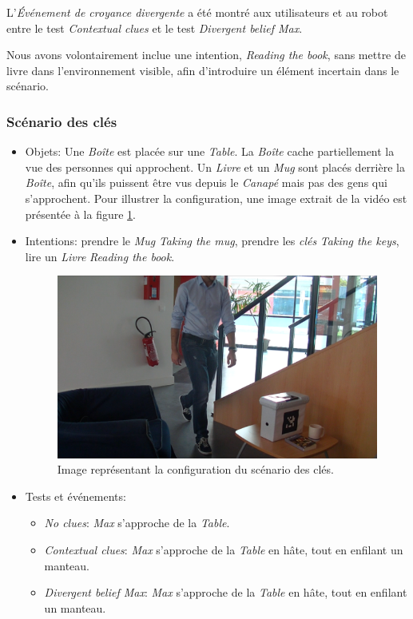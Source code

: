 \documentclass[a4paper,11pt,twoside]{StyleThese}
\begin{document}
L'\textit{Événement de croyance divergente} a été montré aux utilisateurs et au robot entre le test \textit{Contextual clues} et le test \textit{Divergent belief Max}. 

Nous avons volontairement inclue une intention, \textit{Reading the book}, sans mettre de livre dans l'environnement visible, afin d'introduire un élément incertain dans le scénario.

\subsubsection{Scénario des clés}
\begin{itemize}

\item Objets: Une \textit{Boîte} est placée sur une \textit{Table}. La \textit{Boîte} cache partiellement la vue des personnes qui approchent. Un \textit{Livre} et un \textit{Mug} sont placés derrière la \textit{Boîte}, afin qu'ils puissent être vus depuis le \textit{Canapé} mais pas des gens qui s'approchent. Pour illustrer la configuration, une image extrait de la vidéo est présentée à la figure \ref{fig:keyScen}.

\item Intentions: prendre le \textit{Mug} \textit{Taking the mug}, prendre les \textit{clés} \textit{Taking the keys}, lire un \textit{Livre} \textit{Reading the book}.



\begin{figure}[ht!]
  \centering
 \includegraphics[width=0.8\linewidth]{./intention/keys1.png} 
  \caption {Image représentant la configuration du scénario des clés.}
  \label{fig:keyScen}
\end{figure}


\item Tests et événements:
\begin{itemize}
\item \textit{No clues}: \textit{Max} s'approche de la \textit{Table}.
\item\textit{Contextual clues}: \textit{Max} s'approche de la \textit{Table} en hâte, tout en enfilant un manteau.
\item \textit{Divergent belief Max}: \textit{Max} s'approche de la \textit{Table} en hâte, tout en enfilant un manteau.
\end{itemize}


\end{itemize}
\end{document}
